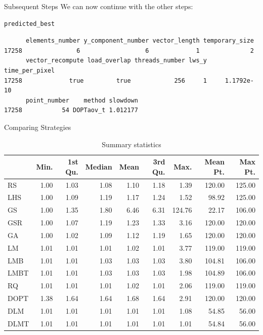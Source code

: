 \documentclass[10pt, compress, aspectratio=169, xcolor={table,usenames,dvipsnames}]{beamer}
\begin{document}
\begin{frame}[fragile,label={sec:org1518b0f}]{Subsequent Steps}
 We can now \alert{continue} with the \alert{other steps}:
\scriptsize
\lstset{language=r,label= ,caption= ,captionpos=b,numbers=none}
\begin{lstlisting}
predicted_best
\end{lstlisting}

\begin{verbatim}
      elements_number y_component_number vector_length temporary_size
17258               6                  6             1              2
      vector_recompute load_overlap threads_number lws_y time_per_pixel
17258             true         true            256     1     1.1792e-10
      point_number    method slowdown
17258           54 DOPTaov_t 1.012177
\end{verbatim}

\normalsize
\end{frame}

\begin{frame}[label={sec:orga5a5e22}]{Comparing Strategies}
\vspace{0.3cm}

\begin{table}[ht]
\centering
\begingroup\small
\begin{tabular}{lrrrrrrrr}
  \hline
 & Min. & 1st Qu. & Median & Mean & 3rd Qu. & Max. & Mean Pt. & Max Pt. \\
  \hline
RS & 1.00 & 1.03 & 1.08 & 1.10 & 1.18 & 1.39 & 120.00 & 125.00 \\
  LHS & 1.00 & 1.09 & 1.19 & 1.17 & 1.24 & 1.52 & 98.92 & 125.00 \\
  GS & 1.00 & 1.35 & 1.80 & 6.46 & 6.31 & 124.76 & 22.17 & 106.00 \\
  GSR & 1.00 & 1.07 & 1.19 & 1.23 & 1.33 & 3.16 & 120.00 & 120.00 \\
  GA & 1.00 & 1.02 & 1.09 & 1.12 & 1.19 & 1.65 & 120.00 & 120.00 \\
  LM & 1.01 & 1.01 & 1.01 & 1.02 & 1.01 & 3.77 & 119.00 & 119.00 \\
  LMB & 1.01 & 1.01 & 1.03 & 1.03 & 1.03 & 3.80 & 104.81 & 106.00 \\
  LMBT & 1.01 & 1.01 & 1.03 & 1.03 & 1.03 & 1.98 & 104.89 & 106.00 \\
  RQ & 1.01 & 1.01 & 1.01 & 1.02 & 1.01 & 2.06 & 119.00 & 119.00 \\
  DOPT & 1.38 & 1.64 & 1.64 & 1.68 & 1.64 & 2.91 & 120.00 & 120.00 \\
  DLM & 1.01 & 1.01 & 1.01 & 1.01 & 1.01 & 1.08 & 54.85 & 56.00 \\
  DLMT & 1.01 & 1.01 & 1.01 & 1.01 & 1.01 & 1.01 & 54.84 & 56.00 \\
   \hline
\end{tabular}
\endgroup
\caption{Summary statistics}
\end{table}
\end{frame}
\end{document}
